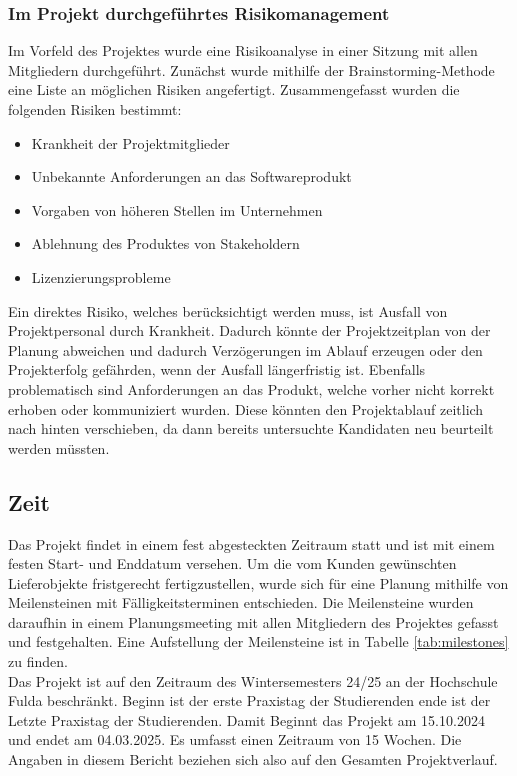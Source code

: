 \documentclass[ThesisDJ.tex]{subfiles}
\begin{document}
\subsubsection{Im Projekt durchgeführtes Risikomanagement}
Im Vorfeld des Projektes wurde eine Risikoanalyse in einer Sitzung mit allen Mitgliedern durchgeführt. Zunächst wurde mithilfe der Brainstorming-Methode eine Liste an möglichen Risiken angefertigt. Zusammengefasst wurden die folgenden Risiken bestimmt:

\begin{itemize}
    \item Krankheit der Projektmitglieder
    \item Unbekannte Anforderungen an das Softwareprodukt
    \item Vorgaben von höheren Stellen im Unternehmen
    \item Ablehnung des Produktes von Stakeholdern
    \item Lizenzierungsprobleme
\end{itemize}

Ein direktes Risiko, welches berücksichtigt werden muss, ist Ausfall von Projektpersonal durch Krankheit. Dadurch könnte der Projektzeitplan von der Planung abweichen und dadurch Verzögerungen im Ablauf erzeugen oder den Projekterfolg gefährden, wenn der Ausfall längerfristig ist. Ebenfalls problematisch sind Anforderungen an das Produkt, welche vorher nicht korrekt erhoben oder kommuniziert wurden. Diese könnten den Projektablauf zeitlich nach hinten verschieben, da dann bereits untersuchte Kandidaten neu beurteilt werden müssten.

\subsection{Zeit}
Das Projekt findet in einem fest abgesteckten Zeitraum statt und ist mit einem festen Start- und Enddatum versehen.
Um die vom Kunden gewünschten Lieferobjekte fristgerecht fertigzustellen, wurde sich für eine Planung mithilfe von Meilensteinen mit
Fälligkeitsterminen entschieden. Die Meilensteine wurden daraufhin in einem Planungsmeeting mit allen Mitgliedern des Projektes gefasst und festgehalten.
Eine Aufstellung der Meilensteine ist in Tabelle \ref{tab:milestones} zu finden.\\

Das Projekt ist auf den Zeitraum des Wintersemesters 24/25 an der Hochschule Fulda beschränkt.
Beginn ist der erste Praxistag der Studierenden ende ist der Letzte Praxistag der Studierenden. 
Damit Beginnt das Projekt am 15.10.2024 und endet am 04.03.2025. Es umfasst einen Zeitraum von 15 Wochen. 
Die Angaben in diesem Bericht beziehen sich also auf den Gesamten Projektverlauf.
\end{document}
